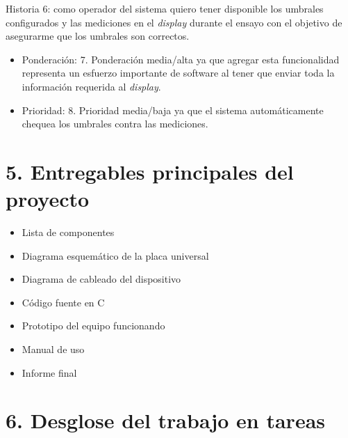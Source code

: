 \documentclass[11pt]{charter}
\begin{document}
Historia 6: como operador del sistema quiero tener disponible los umbrales configurados y las mediciones en el \textit{display} durante el ensayo con el objetivo de asegurarme que los umbrales son correctos.
\begin{itemize}
\item Ponderación: 7. Ponderación media/alta ya que agregar esta funcionalidad representa un esfuerzo importante de software al tener que enviar toda la información requerida al \textit{display}.
\item Prioridad: 8. Prioridad media/baja ya que el sistema automáticamente chequea los umbrales contra las mediciones.
\end{itemize}



\section{5. Entregables principales del proyecto}
\label{sec:entregables}


\begin{itemize}
\item Lista de componentes
\item Diagrama esquemático de la placa universal
\item Diagrama de cableado del dispositivo
\item Código fuente en C
\item Prototipo del equipo funcionando
\item Manual de uso
\item Informe final
\end{itemize}



\section{6. Desglose del trabajo en tareas}
\label{sec:wbs}
\end{document}
